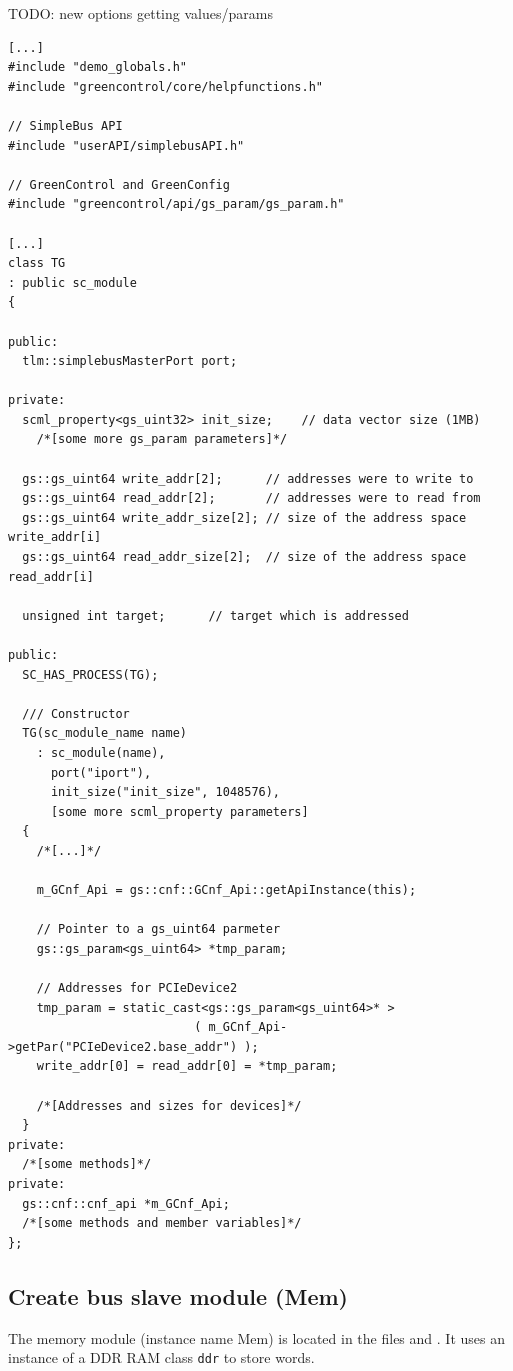 TODO: new options getting values/params

\begin{lstlisting}
[...]
#include "demo_globals.h"
#include "greencontrol/core/helpfunctions.h"

// SimpleBus API
#include "userAPI/simplebusAPI.h"

// GreenControl and GreenConfig
#include "greencontrol/api/gs_param/gs_param.h"

[...]
class TG
: public sc_module
{
  
public:
  tlm::simplebusMasterPort port;

private:
  scml_property<gs_uint32> init_size;    // data vector size (1MB)
	/*[some more gs_param parameters]*/

  gs::gs_uint64 write_addr[2];      // addresses were to write to
  gs::gs_uint64 read_addr[2];       // addresses were to read from
  gs::gs_uint64 write_addr_size[2]; // size of the address space write_addr[i]
  gs::gs_uint64 read_addr_size[2];  // size of the address space read_addr[i]

  unsigned int target;      // target which is addressed

public:
  SC_HAS_PROCESS(TG);
	
  /// Constructor
  TG(sc_module_name name)
    : sc_module(name),
      port("iport"),
      init_size("init_size", 1048576),
      [some more scml_property parameters]
  { 
    /*[...]*/
    
    m_GCnf_Api = gs::cnf::GCnf_Api::getApiInstance(this);
    
    // Pointer to a gs_uint64 parmeter
    gs::gs_param<gs_uint64> *tmp_param;

    // Addresses for PCIeDevice2
    tmp_param = static_cast<gs::gs_param<gs_uint64>* >
                          ( m_GCnf_Api->getPar("PCIeDevice2.base_addr") );
    write_addr[0] = read_addr[0] = *tmp_param;

    /*[Addresses and sizes for devices]*/
  }
private:
  /*[some methods]*/
private:
  gs::cnf::cnf_api *m_GCnf_Api;
  /*[some methods and member variables]*/
};
\end{lstlisting}


\subsection{Create bus slave module (Mem)}
\label{Mem}

The memory module (instance name Mem) is located in the files  and . It uses an instance of a DDR RAM class \lstinline|ddr| to store words.

